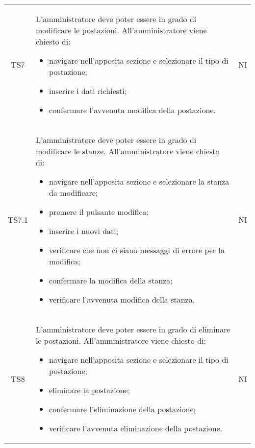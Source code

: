 {\begin{longtable}{ c C{11cm} c }
        TS7&
        \begin{flushleft}
            L'amministratore deve poter essere in grado di modificare le postazioni.
            All'amministratore viene chiesto di:
        \end{flushleft}
        \begin{itemize}
            \item navigare nell'apposita sezione e selezionare il tipo di postazione;
            \item inserire i dati richiesti;
            \item confermare l'avvenuta modifica della postazione.
        \end{itemize}&
        NI\\

        TS7.1&
        \begin{flushleft}
            L'amministratore deve poter essere in grado di modificare le stanze.
            All'amministratore viene chiesto di:
        \end{flushleft}
        \begin{itemize}
            \item navigare nell'apposita sezione e selezionare la stanza da modificare;
            \item premere il pulsante modifica;
            \item inserire i nuovi dati;
            \item verificare che non ci siano messaggi di errore per la modifica;
            \item confermare la modifica della stanza;
            \item verificare l'avvenuta modifica della stanza.
        \end{itemize}&
        NI\\

        TS8&
        \begin{flushleft}
            L'amministratore deve poter essere in grado di eliminare le postazioni.
            All'amministratore viene chiesto di:
        \end{flushleft}
        \begin{itemize}
            \item navigare nell'apposita sezione e selezionare il tipo di postazione;
            \item eliminare la postazione;
            \item confermare l'eliminazione della postazione;
            \item verificare l'avvenuta eliminazione della postazione.
        \end{itemize}&
        NI\\


\end{longtable}}
